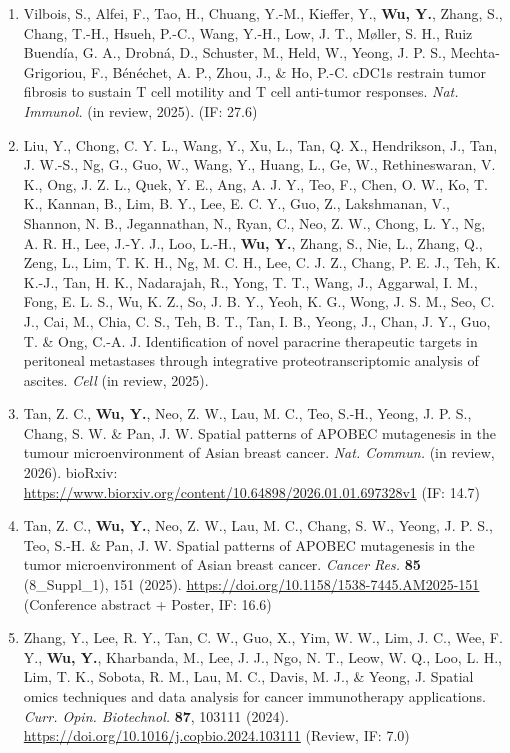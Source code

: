 \documentclass[11pt,a4paper]{article}
\newcommand{\urltext}[1]{\href{#1}{#1}}
\begin{document}
\begin{enumerate}[leftmargin=*,nosep,resume]
\item Vilbois, S., Alfei, F., Tao, H., Chuang, Y.-M., Kieffer, Y., \textbf{Wu, Y.}, Zhang, S., Chang, T.-H., Hsueh, P.-C., Wang, Y.-H., Low, J. T., Møller, S. H., Ruiz Buendía, G. A., Drobná, D., Schuster, M., Held, W., Yeong, J. P. S., Mechta-Grigoriou, F., Bénéchet, A. P., Zhou, J., \& Ho, P.-C. cDC1s restrain tumor fibrosis to sustain T cell motility and T cell anti-tumor responses. \textit{Nat. Immunol.} (in review, 2025). (IF: 27.6)

\item Liu, Y., Chong, C. Y. L., Wang, Y., Xu, L., Tan, Q. X., Hendrikson, J., Tan, J. W.-S., Ng, G., Guo, W., Wang, Y., Huang, L., Ge, W., Rethineswaran, V. K., Ong, J. Z. L., Quek, Y. E., Ang, A. J. Y., Teo, F., Chen, O. W., Ko, T. K., Kannan, B., Lim, B. Y., Lee, E. C. Y., Guo, Z., Lakshmanan, V., Shannon, N. B., Jegannathan, N., Ryan, C., Neo, Z. W., Chong, L. Y., Ng, A. R. H., Lee, J.-Y. J., Loo, L.-H., \textbf{Wu, Y.}, Zhang, S., Nie, L., Zhang, Q., Zeng, L., Lim, T. K. H., Ng, M. C. H., Lee, C. J. Z., Chang, P. E. J., Teh, K. K.-J., Tan, H. K., Nadarajah, R., Yong, T. T., Wang, J., Aggarwal, I. M., Fong, E. L. S., Wu, K. Z., So, J. B. Y., Yeoh, K. G., Wong, J. S. M., Seo, C. J., Cai, M., Chia, C. S., Teh, B. T., Tan, I. B., Yeong, J., Chan, J. Y., Guo, T. \& Ong, C.-A. J. Identification of novel paracrine therapeutic targets in peritoneal metastases through integrative proteotranscriptomic analysis of ascites. \textit{Cell} (in review, 2025).

\item Tan, Z. C., \textbf{Wu, Y.}, Neo, Z. W., Lau, M. C., Teo, S.-H., Yeong, J. P. S., Chang, S. W. \& Pan, J. W. Spatial patterns of APOBEC mutagenesis in the tumour microenvironment of Asian breast cancer. \textit{Nat. Commun.} (in review, 2026). bioRxiv: \urltext{https://www.biorxiv.org/content/10.64898/2026.01.01.697328v1} (IF: 14.7)

\item Tan, Z. C., \textbf{Wu, Y.}, Neo, Z. W., Lau, M. C., Chang, S. W., Yeong, J. P. S., Teo, S.-H. \& Pan, J. W. Spatial patterns of APOBEC mutagenesis in the tumor microenvironment of Asian breast cancer. \textit{Cancer Res.} \textbf{85} (8\_Suppl\_1), 151 (2025). \urltext{https://doi.org/10.1158/1538-7445.AM2025-151} (Conference abstract + Poster, IF: 16.6)

\item Zhang, Y., Lee, R. Y., Tan, C. W., Guo, X., Yim, W. W., Lim, J. C., Wee, F. Y., \textbf{Wu, Y.}, Kharbanda, M., Lee, J. J., Ngo, N. T., Leow, W. Q., Loo, L. H., Lim, T. K., Sobota, R. M., Lau, M. C., Davis, M. J., \& Yeong, J. Spatial omics techniques and data analysis for cancer immunotherapy applications. \textit{Curr. Opin. Biotechnol.} \textbf{87}, 103111 (2024). \urltext{https://doi.org/10.1016/j.copbio.2024.103111} (Review, IF: 7.0)


\end{enumerate}
\end{document}
